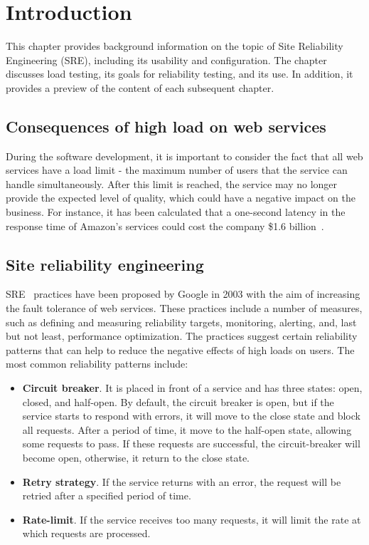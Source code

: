 \chapter{Introduction}
\label{ch:intro}

This chapter provides background information on the topic of Site Reliability Engineering (SRE), including its usability and configuration.
The chapter discusses load testing, its goals for reliability testing, and its use. In addition, it provides a preview of the content of each subsequent chapter.

\section{Consequences of high load on web services}\label{sec:consequences-of-high-load-on-web-services}
During the software development, it is important to consider the fact that all web services have a load limit - the maximum number of users that the service can handle simultaneously. After this limit is reached, the service may no longer provide the expected level of quality, which could have a negative impact on the business. For instance, it has been calculated that a one-second latency in the response time of Amazon's services could cost the company \$1.6 billion~\cite{one_second_article}.


\section{Site reliability engineering}\label{sec:site-reliability-engineering}
SRE~\cite{sre_main_site} practices have been proposed by Google in 2003 with the aim of increasing the fault tolerance of web services. These practices include a number of measures, such as defining and measuring reliability targets, monitoring, alerting, and, last but not least, performance optimization. The practices suggest certain reliability patterns that can help to reduce the negative effects of high loads on users.
The most common reliability patterns include:

\begin{itemize}
\item \textbf{Circuit breaker}. It is placed in front of a service and has three states: open, closed, and half-open. By default, the circuit breaker is open, but if the service starts to respond with errors, it will move to the close state and block all requests. After a period of time, it move to the half-open state, allowing some requests to pass. If these requests are successful, the circuit-breaker will become open, otherwise, it return to the close state.
\item \textbf{Retry strategy}. If the service returns with an error, the request will be retried after a specified period of time.
\item \textbf{Rate-limit}. If the service receives too many requests, it will limit the rate at which requests are processed.
\end{itemize}

